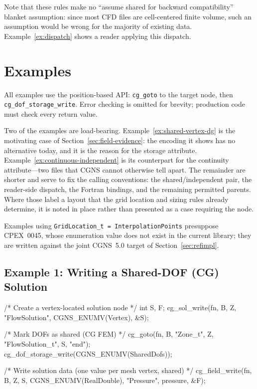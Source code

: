 \documentclass[11pt,letterpaper]{article}
\makeatletter
\let\cgns@orig@lstlisting\lstlisting
\let\cgns@endorig@lstlisting\endlstlisting
\renewenvironment{lstlisting}
  {\par\needspace{5\baselineskip}\nolinenumbers\cgns@orig@lstlisting}
  {\cgns@endorig@lstlisting\par\linenumbers}
\makeatother
\begin{document}
Note that these rules make no ``assume shared for backward
compatibility'' blanket assumption: since most CFD files are
cell-centered finite volume, such an assumption would be wrong for the
majority of existing data.  Example~\ref{ex:dispatch} shows a reader
applying this dispatch.

\section{Examples}

All examples use the position-based API: \texttt{cg\_goto} to the
target node, then \texttt{cg\_dof\_storage\_write}.  Error checking is
omitted for brevity; production code must check every return value.

Two of the examples are load-bearing.
Example~\ref{ex:shared-vertex-dg} is the motivating case of
Section~\ref{sec:field-evidence}: the encoding it shows has no
alternative today, and it is the reason for the storage attribute.
Example~\ref{ex:continuous-independent} is its counterpart for the
continuity attribute---two files that CGNS cannot otherwise tell
apart.  The remainder are shorter and serve to fix the calling
conventions: the shared/independent pair, the reader-side dispatch, the
Fortran bindings, and the remaining permitted parents.  Where those
label a layout that the grid location and sizing rules already
determine, it is noted in place rather than presented as a case
requiring the node.

Examples using \texttt{GridLocation\_t = InterpolationPoints} presuppose
CPEX~0045, whose enumeration value does not exist in the current
library; they are written against the joint CGNS~5.0 target of
Section~\ref{sec:refimpl}.

\subsection{Example 1: Writing a Shared-DOF (CG) Solution}
\label{ex:cg-write}

\begin{lstlisting}[language=C]
/* Create a vertex-located solution node */
int S, F;
cg_sol_write(fn, B, Z, "FlowSolution", CGNS_ENUMV(Vertex), &S);

/* Mark DOFs as shared (CG FEM) */
cg_goto(fn, B, "Zone_t", Z, "FlowSolution_t", S, "end");
cg_dof_storage_write(CGNS_ENUMV(SharedDofs));

/* Write solution data (one value per mesh vertex, shared) */
cg_field_write(fn, B, Z, S, CGNS_ENUMV(RealDouble),
    "Pressure", pressure, &F);
\end{lstlisting}
\end{document}
